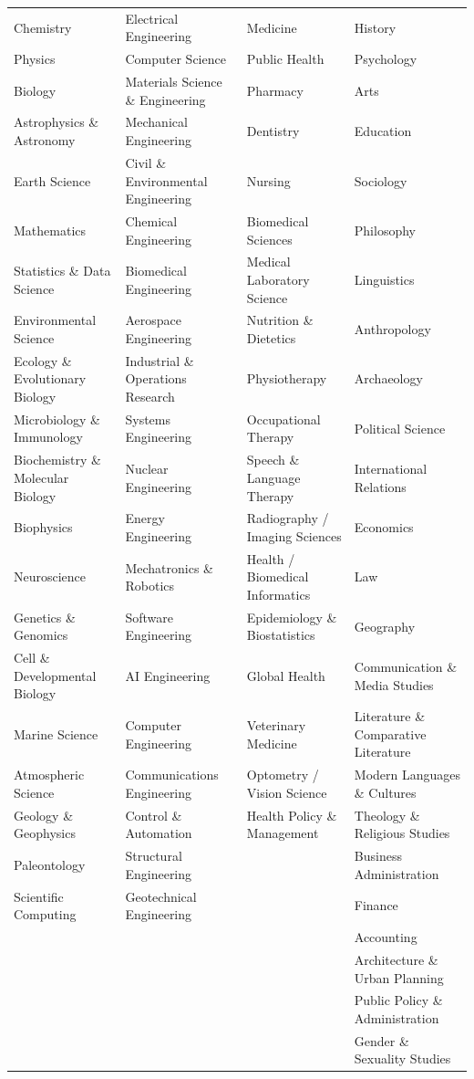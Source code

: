 \begin{table}[h]
{\begin{tabular}{C{0.24\textwidth} C{0.24\textwidth} C{0.24\textwidth} C{0.24\textwidth}}
Chemistry & Electrical Engineering & Medicine & History \\
Physics & Computer Science & Public Health & Psychology \\
Biology & Materials Science \& Engineering & Pharmacy & Arts \\
Astrophysics \& Astronomy & Mechanical Engineering & Dentistry & Education \\
Earth Science & Civil \& Environmental Engineering & Nursing & Sociology \\
Mathematics & Chemical Engineering & Biomedical Sciences & Philosophy \\
Statistics \& Data Science & Biomedical Engineering & Medical Laboratory Science & Linguistics \\
Environmental Science & Aerospace Engineering & Nutrition \& Dietetics & Anthropology \\
Ecology \& Evolutionary Biology & Industrial \& Operations Research & Physiotherapy & Archaeology \\
Microbiology \& Immunology & Systems Engineering & Occupational Therapy & Political Science \\
Biochemistry \& Molecular Biology & Nuclear Engineering & Speech \& Language Therapy & International Relations \\
Biophysics & Energy Engineering & Radiography / Imaging Sciences & Economics \\
Neuroscience & Mechatronics \& Robotics & Health / Biomedical Informatics & Law \\
Genetics \& Genomics & Software Engineering & Epidemiology \& Biostatistics & Geography \\
Cell \& Developmental Biology & AI Engineering & Global Health & Communication \& Media Studies \\
Marine Science & Computer Engineering & Veterinary Medicine & Literature \& Comparative Literature \\
Atmospheric Science & Communications Engineering & Optometry / Vision Science & Modern Languages \& Cultures \\
Geology \& Geophysics & Control \& Automation & Health Policy \& Management & Theology \& Religious Studies \\
Paleontology & Structural Engineering &  & Business Administration\\
Scientific Computing & Geotechnical Engineering &  & Finance \\
 &  &  & Accounting \\
 &  &  & Architecture \& Urban Planning \\
 &  &  & Public Policy \& Administration \\
 &  &  & Gender \& Sexuality Studies \\

\bottomrule[1pt]
\end{tabular}
}
\end{table}
